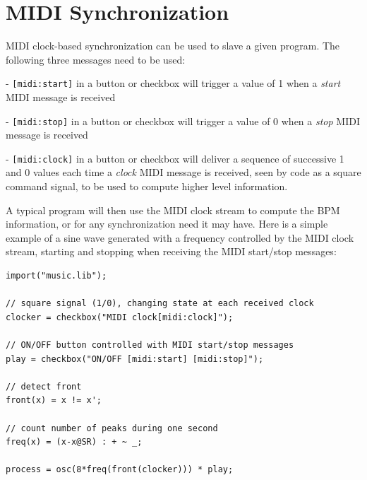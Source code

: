 \section{MIDI Synchronization}

MIDI clock-based synchronization can be used to slave a given \faust program. The following three messages need to be used:

- \lstinline'[midi:start]' in a button or checkbox will trigger a value of 1 when a \emph{start} MIDI message is received

- \lstinline'[midi:stop]' in a button or checkbox will trigger a value of 0 when a \emph{stop} MIDI message is received

- \lstinline'[midi:clock]' in a button or checkbox will deliver a sequence of successive 1 and 0 values each time a  \emph{clock} MIDI message is received, seen by \faust code as a square command signal, to be used to compute higher level information.

A typical \faust program will then use the MIDI clock stream to compute the BPM information, or for any synchronization need it may have.  Here is a simple example of a sine wave generated with a frequency controlled by the MIDI clock stream, starting and stopping when receiving the MIDI start/stop messages:

\begin{lstlisting}
import("music.lib");

// square signal (1/0), changing state at each received clock
clocker = checkbox("MIDI clock[midi:clock]");    

// ON/OFF button controlled with MIDI start/stop messages
play = checkbox("ON/OFF [midi:start] [midi:stop]");    

// detect front
front(x) = x != x';     

// count number of peaks during one second
freq(x) = (x-x@SR) : + ~ _;   
   
process = osc(8*freq(front(clocker))) * play;
\end{lstlisting}



